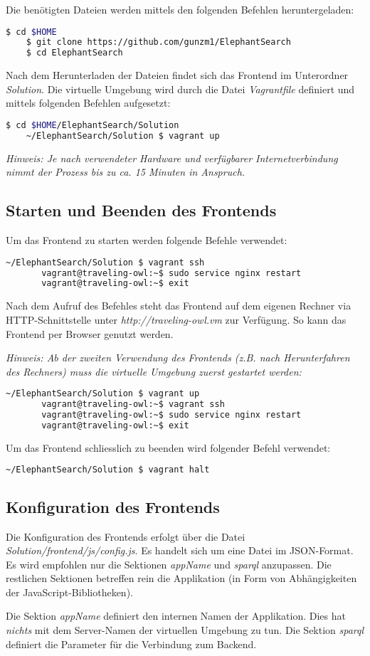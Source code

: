 Die benötigten Dateien werden mittels den folgenden Befehlen heruntergeladen:
\begin{lstlisting}[language=bash]
    $ cd $HOME
    $ git clone https://github.com/gunzm1/ElephantSearch
    $ cd ElephantSearch
\end{lstlisting}

Nach dem Herunterladen der Dateien findet sich das Frontend im Unterordner \textit{Solution}. Die virtuelle Umgebung wird durch die Datei \textit{Vagrantfile} definiert und mittels folgenden Befehlen aufgesetzt:
\begin{lstlisting}[language=bash]
                              $ cd $HOME/ElephantSearch/Solution
    ~/ElephantSearch/Solution $ vagrant up
\end{lstlisting}
\textit{Hinweis: Je nach verwendeter Hardware und verfügbarer Internetverbindung nimmt der Prozess bis zu ca. 15 Minuten in Anspruch.}

\subsection{Starten und Beenden des Frontends}
\label{chap:anh:ihb:frontend:start}
Um das Frontend zu starten werden folgende Befehle verwendet:
\begin{lstlisting}[language=bash]
    ~/ElephantSearch/Solution $ vagrant ssh
       vagrant@traveling-owl:~$ sudo service nginx restart
       vagrant@traveling-owl:~$ exit
\end{lstlisting}
Nach dem Aufruf des Befehles steht das Frontend auf dem eigenen Rechner via HTTP-Schnittstelle unter \textit{http://traveling-owl.vm} zur Verfügung. So kann das Frontend per Browser genutzt werden.

\textit{Hinweis: Ab der zweiten Verwendung des Frontends (z.B. nach Herunterfahren des Rechners) muss die virtuelle Umgebung zuerst gestartet werden:}
\begin{lstlisting}[language=bash]
    ~/ElephantSearch/Solution $ vagrant up
       vagrant@traveling-owl:~$ vagrant ssh
       vagrant@traveling-owl:~$ sudo service nginx restart
       vagrant@traveling-owl:~$ exit
\end{lstlisting}

Um das Frontend schliesslich zu beenden wird folgender Befehl verwendet:
\begin{lstlisting}[language=bash]
    ~/ElephantSearch/Solution $ vagrant halt
\end{lstlisting}

\subsection{Konfiguration des Frontends}
\label{chap:anh:ihb:frontend:config}
Die Konfiguration des Frontends erfolgt über die Datei \textit{Solution/frontend/js/config.js}. Es handelt sich um eine Datei im JSON-Format. Es wird empfohlen nur die Sektionen \textit{appName} und \textit{sparql} anzupassen. Die restlichen Sektionen betreffen rein die Applikation (in Form von Abhängigkeiten der JavaScript-Bibliotheken).

Die Sektion \textit{appName} definiert den internen Namen der Applikation. Dies hat \textit{nichts} mit dem Server-Namen der virtuellen Umgebung zu tun. Die Sektion \textit{sparql} definiert die Parameter für die Verbindung zum Backend.
